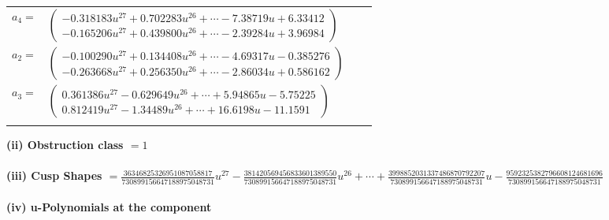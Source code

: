 \documentclass[1p]{elsarticle_modified}
\theoremstyle{definition}
\begin{document}
\begin{tabular}{m{7pt} m{180pt} m{7pt} m{180pt} }
\flushright $a_{4}=$&$\begin{pmatrix}-0.318183 u^{27}+0.702283 u^{26}+\cdots-7.38719 u+6.33412\\-0.165206 u^{27}+0.439800 u^{26}+\cdots-2.39284 u+3.96984\end{pmatrix}$ \\
\flushright $a_{2}=$&$\begin{pmatrix}-0.100290 u^{27}+0.134408 u^{26}+\cdots-4.69317 u-0.385276\\-0.263668 u^{27}+0.256350 u^{26}+\cdots-2.86034 u+0.586162\end{pmatrix}$ \\
\flushright $a_{3}=$&$\begin{pmatrix}0.361386 u^{27}-0.629649 u^{26}+\cdots+5.94865 u-5.75225\\0.812419 u^{27}-1.34489 u^{26}+\cdots+16.6198 u-11.1591\end{pmatrix}$\\&\end{tabular}
\flushleft \textbf{(ii) Obstruction class $= 1$}\\~\\
\flushleft \textbf{(iii) Cusp Shapes $= \frac{36346825326951087058817}{730899156647188975048731} u^{27}-\frac{381420569456833601389550}{730899156647188975048731} u^{26}+\cdots+\frac{3998852031337486870792207}{730899156647188975048731} u-\frac{9592325382796608124681696}{730899156647188975048731}$}\\~\\
\newpage\renewcommand{\arraystretch}{1}
\flushleft \textbf{(iv) u-Polynomials at the component}\newline \\
\end{document}
